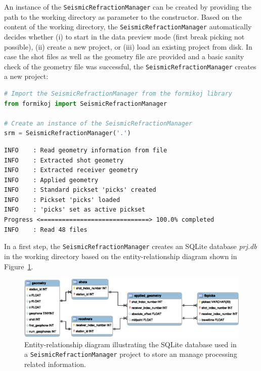 \documentclass[a4paper,fleqn]{cas-sc}
\begin{document}
An instance of the \texttt{SeismicRefractionManager} can be created by providing the path to the working directory as parameter to the constructor. Based on the content of the working directory, the \texttt{SeismicRefractionManager} automatically decides whether (i) to start in the data preview mode (first break picking not possible), (ii) create a new project, or (iii) load an existing project from disk.
In case the shot files as well as the geometry file are provided and a basic sanity check of the geometry file was successful, the \texttt{SeismicRefractionManager} creates a new project:
\begin{lstlisting}[language=Python, firstnumber=1]
# Import the SeismicRefractionManager from the formikoj library
from formikoj import SeismicRefractionManager

# Create an instance of the SeismicRefractionManager
srm = SeismicRefractionManager('.')
\end{lstlisting}
\begin{footnotesize}
\begin{verbatim}
INFO    : Read geometry information from file
INFO    : Extracted shot geometry
INFO    : Extracted receiver geometry
INFO    : Applied geometry
INFO    : Standard pickset 'picks' created
INFO    : Pickset 'picks' loaded
INFO    : 'picks' set as active pickset
Progress <==============================> 100.0% completed
INFO    : Read 48 files
\end{verbatim}
\end{footnotesize}
In a first step, the \texttt{SeismicRefractionManager} creates an SQLite database \textit{prj.db} in the working directory based on the entity-relationship diagram shown in Figure~\ref{fig:database}.
\begin{figure}
	\centering
	\includegraphics[width=.75\textwidth]{figures/srm_erd.eps}
	\caption{Entity-relationship diagram illustrating the SQLite database used in a \texttt{SeismicRefractionManager} project to store an manage processing related information.}
	\label{fig:database}
\end{figure}
\end{document}

